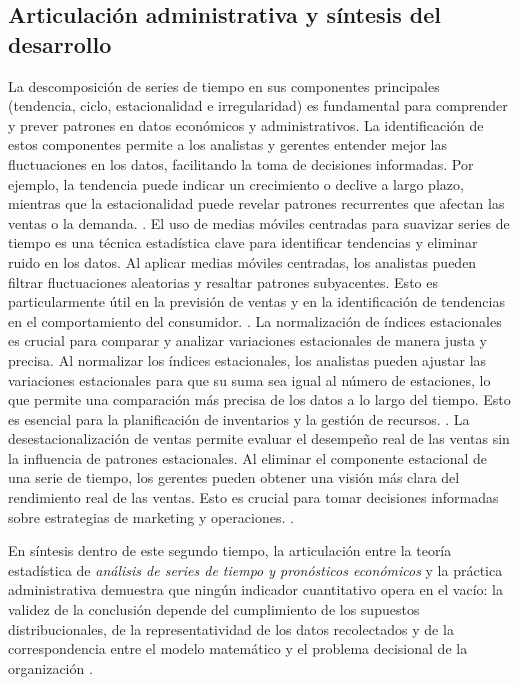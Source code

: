 {\subsection{Articulación administrativa y síntesis del desarrollo}
La descomposición de series de tiempo en sus componentes principales (tendencia, ciclo, estacionalidad e irregularidad) es fundamental para comprender y prever patrones en datos económicos y administrativos. La identificación de estos componentes permite a los analistas y gerentes entender mejor las fluctuaciones en los datos, facilitando la toma de decisiones informadas. Por ejemplo, la tendencia puede indicar un crecimiento o declive a largo plazo, mientras que la estacionalidad puede revelar patrones recurrentes que afectan las ventas o la demanda. \citep{holmesBusiness2023,nistHandbook}.
El uso de medias móviles centradas para suavizar series de tiempo es una técnica estadística clave para identificar tendencias y eliminar ruido en los datos. Al aplicar medias móviles centradas, los analistas pueden filtrar fluctuaciones aleatorias y resaltar patrones subyacentes. Esto es particularmente útil en la previsión de ventas y en la identificación de tendencias en el comportamiento del consumidor. \citep{holmesBusiness2023,nistHandbook}.
La normalización de índices estacionales es crucial para comparar y analizar variaciones estacionales de manera justa y precisa. Al normalizar los índices estacionales, los analistas pueden ajustar las variaciones estacionales para que su suma sea igual al número de estaciones, lo que permite una comparación más precisa de los datos a lo largo del tiempo. Esto es esencial para la planificación de inventarios y la gestión de recursos. \citep{holmesBusiness2023,nistHandbook}.
La desestacionalización de ventas permite evaluar el desempeño real de las ventas sin la influencia de patrones estacionales. Al eliminar el componente estacional de una serie de tiempo, los gerentes pueden obtener una visión más clara del rendimiento real de las ventas. Esto es crucial para tomar decisiones informadas sobre estrategias de marketing y operaciones. \citep{holmesBusiness2023,nistHandbook}.

En síntesis dentro de este segundo tiempo, la articulación entre la teoría estadística de \textit{análisis de series de tiempo y pronósticos económicos} y la práctica administrativa demuestra que ningún indicador cuantitativo opera en el vacío: la validez de la conclusión depende del cumplimiento de los supuestos distribucionales, de la representatividad de los datos recolectados y de la correspondencia entre el modelo matemático y el problema decisional de la organización \citep{anderson2012,nistHandbook,guarin2002}.

}
